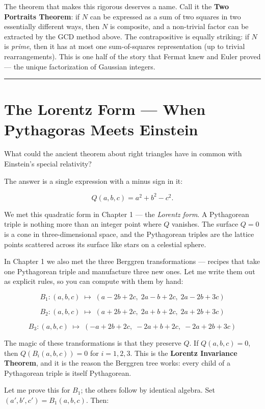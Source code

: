 The theorem that makes this rigorous deserves a name. Call it the \textbf{Two Portraits Theorem}: if \(N\) can be expressed as a sum of two squares in two essentially different ways, then \(N\) is composite, and a non-trivial factor can be extracted by the GCD method above. The contrapositive is equally striking: if \(N\) is \emph{prime}, then it has at most one sum-of-squares representation (up to trivial rearrangements). This is one half of the story that Fermat knew and Euler proved --- the unique factorization of Gaussian integers.

\bigskip\noindent\rule{\linewidth}{0.4pt}\bigskip

\section{The Lorentz Form --- When Pythagoras Meets Einstein}
What could the ancient theorem about right triangles have in common with Einstein's special relativity?

The answer is a single expression with a minus sign in it:

\[Q(a, b, c) = a^2 + b^2 - c^2.\]

We met this quadratic form in Chapter 1 --- the \emph{Lorentz form}. A Pythagorean triple is nothing more than an integer point where \(Q\) vanishes. The surface \(Q = 0\) is a cone in three-dimensional space, and the Pythagorean triples are the lattice points scattered across its surface like stars on a celestial sphere.

In Chapter 1 we also met the three Berggren transformations --- recipes that take one Pythagorean triple and manufacture three new ones. Let me write them out as explicit rules, so you can compute with them by hand:

\[B_1: (a, b, c) \;\longmapsto\; (a - 2b + 2c,\; 2a - b + 2c,\; 2a - 2b + 3c)\]

\[B_2: (a, b, c) \;\longmapsto\; (a + 2b + 2c,\; 2a + b + 2c,\; 2a + 2b + 3c)\]

\[B_3: (a, b, c) \;\longmapsto\; (-a + 2b + 2c,\; -2a + b + 2c,\; -2a + 2b + 3c)\]

The magic of these transformations is that they preserve \(Q\). If \(Q(a, b, c) = 0\), then \(Q(B_i(a, b, c)) = 0\) for \(i = 1, 2, 3\). This is the \textbf{Lorentz Invariance Theorem}, and it is the reason the Berggren tree works: every child of a Pythagorean triple is itself Pythagorean.

Let me prove this for \(B_1\); the others follow by identical algebra. Set \((a', b', c') = B_1(a, b, c)\). Then:

